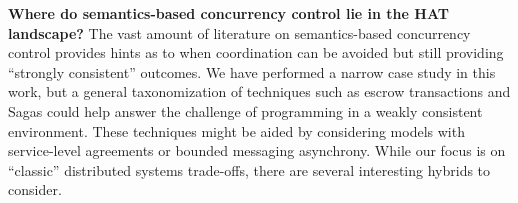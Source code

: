 \textbf{Where do semantics-based concurrency control lie in the HAT
  landscape?} The vast amount of literature on semantics-based
concurrency control provides hints as to when coordination can be
avoided but still providing ``strongly consistent'' outcomes. We have
performed a narrow case study in this work, but a general
taxonomization of techniques such as escrow transactions and Sagas
could help answer the challenge of programming in a weakly consistent
environment. These techniques might be aided by considering models
with service-level agreements or bounded messaging asynchrony. While
our focus is on ``classic'' distributed systems trade-offs, there are
several interesting hybrids to consider.
